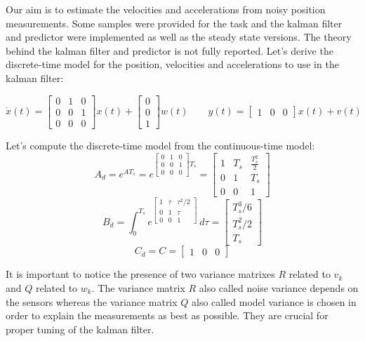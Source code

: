 \documentclass[a4paper,12pt]{article}
\begin{document}
Our aim is to estimate the velocities and accelerations from noisy position measurements. Some samples were provided for the task and the kalman filter and predictor were implemented as well as the steady state versions. The theory behind the kalman filter and predictor is not fully reported. Let's derive the discrete-time model for the position, velocities and accelerations to use in the kalman filter:

\begin{equation}
    \dot{x}(t) =  \begin{bmatrix}  0&1&0 \\ 0&0&1\\0&0&0 \end{bmatrix} x(t) + \begin{bmatrix}  0\\0\\1 \end{bmatrix} w(t)
    \qquad
    y(t) = \begin{bmatrix}  1&0&0 \end{bmatrix}x(t) + v(t)
\end{equation}

\noindent Let's compute the discrete-time model from the continuous-time model:
\[
    A_d = e^{AT_s} = e^{\begin{bmatrix}  0&1&0 \\ 0&0&1\\0&0&0 \end{bmatrix}T_s} = \begin{bmatrix} 1&T_s&\frac{T_s^2}{2}\\0&1&T_s\\0&0&1 \end{bmatrix}
\]
\[
    B_d = \int_{0}^{T_s} e^{\begin{bmatrix} 1&\tau&\tau^2/2\\0&1&\tau\\0&0&1 \end{bmatrix}} \,d\tau  = \begin{bmatrix} T_s^3/6\\T_s^2/2\\T_s \end{bmatrix}
\]
\[
    C_d = C = \begin{bmatrix} 1&0&0 \end{bmatrix}
\]

It is important to notice the presence of two variance matrixes $R$ related to $v_k$ and $Q$ related to $w_k$. The variance matrix $R$ also called noise variance depends on the sensors whereas the variance
matrix $Q$ also called model variance is chosen in order to explain the measurements as best as
possible. They are crucial for proper tuning of the kalman filter.
\end{document}
